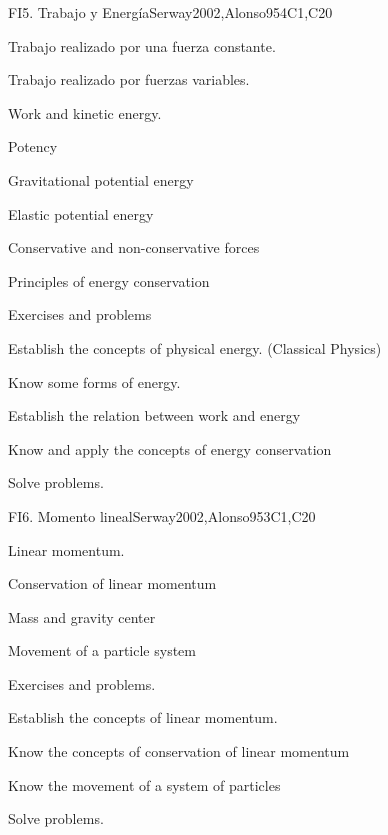 \begin{syllabus}
\begin{unit}{FI5. Trabajo y Energía}{}{Serway2002,Alonso95}{4}{C1,C20}
\begin{topics}
	\item Trabajo realizado por una fuerza constante.
	\item Trabajo realizado por fuerzas variables.
	\item Work and kinetic energy.
	\item Potency
	\item Gravitational potential energy
	\item Elastic potential energy
	\item Conservative and non-conservative forces
	\item Principles of energy conservation
	\item Exercises and problems
\end{topics}

   \begin{learningoutcomes}
      \item Establish the concepts of physical energy. (Classical Physics)
      \item Know some forms of energy.
      \item Establish the relation between work and energy
      \item Know and apply the concepts of energy conservation
      \item Solve problems.
   \end{learningoutcomes}
\end{unit}

\begin{unit}{FI6. Momento lineal}{}{Serway2002,Alonso95}{3}{C1,C20}
\begin{topics}
      \item Linear momentum.
      \item Conservation of linear momentum
      \item Mass and gravity center
      \item Movement of a particle system
      \item Exercises and problems.
  \end{topics}

   \begin{learningoutcomes}
      \item Establish the concepts of linear momentum.
      \item Know the concepts of conservation of linear momentum
      \item Know the movement of a system of particles
      \item Solve problems.
   \end{learningoutcomes}
\end{unit}


\end{syllabus}
